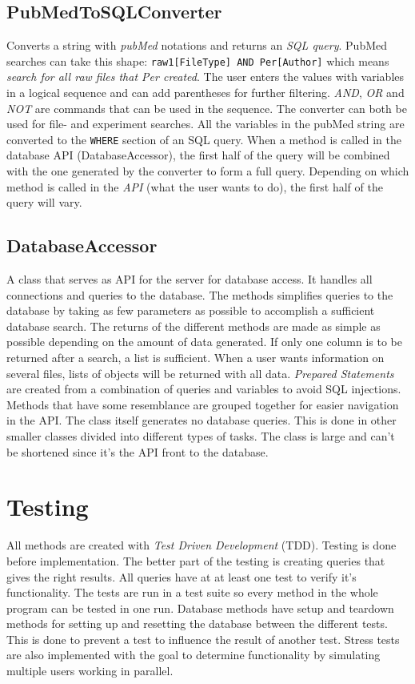 \documentclass[a4paper]{report}
\newcommand{\term}[1]{\textit{#1}}
\begin{document}
\subsection{PubMedToSQLConverter}
Converts a string with \term{pubMed} notations and returns an \term{SQL query}. PubMed searches can take this shape: \texttt{raw1[FileType] AND Per[Author]} which means \term{search for all raw files that Per created}. The user enters the values with variables in a logical sequence and can add parentheses for further filtering. \term{AND}, \term{OR} and \term{NOT} are commands that can be used in the sequence. The converter can both be used for file- and experiment searches. All the variables in the pubMed string are converted to the \texttt{WHERE} section of an SQL query. When a method is called in the database API (DatabaseAccessor), the first half of the query will be combined with the one generated by the converter to form a full query. Depending on which method is called in the \term{API} (what the user wants to do), the first half of the query will vary.

\subsection{DatabaseAccessor}
A class that serves as API for the server for database access. It handles all connections and queries to the database. The methods simplifies queries to the database by taking as few parameters as possible to accomplish a sufficient database search. The returns of the different methods are made as simple as possible depending on the amount of data generated. If only one column is to be returned after a search, a list is sufficient. When a user wants information on several files, lists of objects will be returned with all data. \term{Prepared Statements} are created from a combination of queries and variables to avoid SQL injections. Methods that have some resemblance are grouped together for easier navigation in the API. The class itself generates no database queries. This is done in other smaller classes divided into different types of tasks. The class is large and can't be shortened since it's the API front to the database.

\section{Testing}
All methods are created with \term{Test Driven Development} (TDD). Testing is done before implementation. The better part of the testing is creating queries that gives the right results. All queries have at at least one test to verify it's functionality. The tests are run in a test suite so every method in the whole program can be tested in one run. Database methods have setup and teardown methods for setting up and resetting the database between the different tests. This is done to prevent a test to influence the result of another test. Stress tests are also implemented with the goal to determine functionality by simulating multiple users working in parallel.
\end{document}
